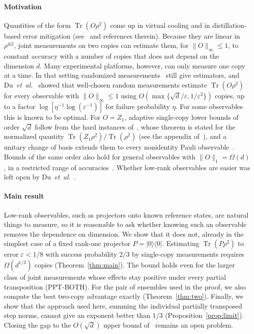 \documentclass[pdflatex,sn-mathphys-num]{sn-jnl}%
\theoremstyle{thmstyleone}
\theoremstyle{thmstylethree}
\theoremstyle{thmstyletwo}
\newcommand{\Tr}{\operatorname{Tr}}
\newcommand{\ket}[1]{|#1\rangle}
\newcommand{\bra}[1]{\langle #1|}
\begin{document}
\paragraph{Motivation} Quantities of the form $\Tr(O\rho^2)$ come up in virtual cooling and in distillation-based
error mitigation (see~\cite{du} and references therein). Because they are linear in $\rho^{\otimes2}$, joint
measurements on two copies can estimate them, for $\|O\|_\infty\le1$, to constant accuracy with a number of copies that
does not depend on the dimension $d$. Many experimental platforms, however, can only measure one copy at a time. In that
setting randomized measurements~\cite{hkp20} still give estimators, and Du~\emph{et~al.}~\cite{du} showed that
well-chosen random measurements estimate $\Tr(O\rho^2)$ for every observable with $\|O\|_\infty\le1$ using
$O(\max\{\sqrt d/\varepsilon,1/\varepsilon^2\})$ copies, up to a factor $\log[\eta^{-1}\log(\varepsilon^{-1})]$ for
failure probability $\eta$. For some observables this is known to be optimal. For $O=Z_1$, adaptive single-copy lower
bounds of order $\sqrt d$ follow from the hard instances of~\cite{hbc22}, whose theorem is stated for the normalized
quantity $\Tr(Z_1\rho^2)/\Tr(\rho^2)$ (see the appendix of~\cite{du}), and a unitary change of basis extends them to
every nonidentity Pauli observable~\cite{du}. Bounds of the same order also hold for general observables with
$\|O\|_1=\Omega(d)$, in a restricted range of accuracies~\cite{ye}. Whether low-rank observables are easier was left
open by Du~\emph{et~al.}~\cite{du}.

\paragraph{Main result} Low-rank observables, such as projectors onto known reference states, are natural things to
measure, so it is reasonable to ask whether knowing such an observable removes the dependence on dimension. We show
that it does not, already in the simplest case of a fixed rank-one projector $P=\ket0\bra0$. Estimating
$\Tr(P\rho^2)$ to error $\varepsilon<1/8$ with success probability $2/3$ by single-copy measurements requires
$\Omega(d^{1/3})$ copies (Theorem~\ref{thm:main}). The bound holds even for the larger class of joint measurements whose
effects stay positive under every partial transposition (PPT-BOTH). For the pair of ensembles used in the proof, we
also compute the best two-copy advantage exactly (Theorem~\ref{thm:two}). Finally, we show that the approach used here,
summing the individual partially transposed step norms, cannot give an exponent better than $1/3$
(Proposition~\ref{prop:limit}). Closing the gap to the $O(\sqrt d)$ upper bound of~\cite{du} remains an open problem.
\end{document}
